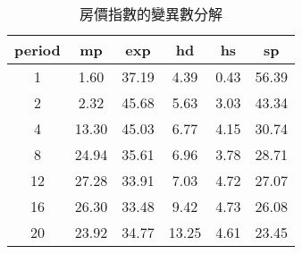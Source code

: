 \begin{table}[h]
\centering
\begin{tabular}{cccccc}
  \hline
period & mp & exp & hd & hs & sp \\ 
  \hline
1 & 1.60 & 37.19 & 4.39 & 0.43 & 56.39 \\ 
   \hline
2 & 2.32 & 45.68 & 5.63 & 3.03 & 43.34 \\ 
   \hline
4 & 13.30 & 45.03 & 6.77 & 4.15 & 30.74 \\ 
   \hline
8 & 24.94 & 35.61 & 6.96 & 3.78 & 28.71 \\ 
   \hline
12 & 27.28 & 33.91 & 7.03 & 4.72 & 27.07 \\ 
   \hline
16 & 26.30 & 33.48 & 9.42 & 4.73 & 26.08 \\ 
   \hline
20 & 23.92 & 34.77 & 13.25 & 4.61 & 23.45 \\ 
   \hline
\end{tabular}
\caption{房價指數的變異數分解} 
\end{table}
